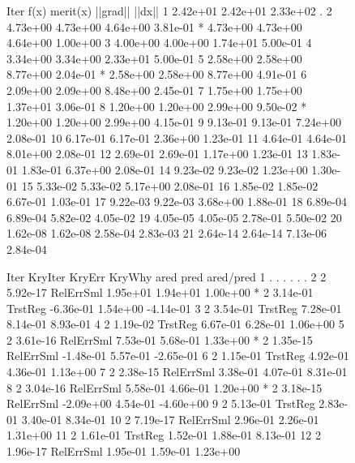 \begin{figure}
    \begin{lstPeopt}
Iter      f(x)      merit(x)  ||grad||  ||dx||    
1         2.42e+01  2.42e+01  2.33e+02  .         
2         4.73e+00  4.73e+00  4.64e+00  3.81e-01  
*         4.73e+00  4.73e+00  4.64e+00  1.00e+00  
3         4.00e+00  4.00e+00  1.74e+01  5.00e-01  
4         3.34e+00  3.34e+00  2.33e+01  5.00e-01  
5         2.58e+00  2.58e+00  8.77e+00  2.04e-01  
*         2.58e+00  2.58e+00  8.77e+00  4.91e-01  
6         2.09e+00  2.09e+00  8.48e+00  2.45e-01  
7         1.75e+00  1.75e+00  1.37e+01  3.06e-01  
8         1.20e+00  1.20e+00  2.99e+00  9.50e-02  
*         1.20e+00  1.20e+00  2.99e+00  4.15e-01  
9         9.13e-01  9.13e-01  7.24e+00  2.08e-01  
10        6.17e-01  6.17e-01  2.36e+00  1.23e-01  
11        4.64e-01  4.64e-01  8.01e+00  2.08e-01  
12        2.69e-01  2.69e-01  1.17e+00  1.23e-01  
13        1.83e-01  1.83e-01  6.37e+00  2.08e-01  
14        9.23e-02  9.23e-02  1.23e+00  1.30e-01  
15        5.33e-02  5.33e-02  5.17e+00  2.08e-01  
16        1.85e-02  1.85e-02  6.67e-01  1.03e-01  
17        9.22e-03  9.22e-03  3.68e+00  1.88e-01  
18        6.89e-04  6.89e-04  5.82e-02  4.05e-02  
19        4.05e-05  4.05e-05  2.78e-01  5.50e-02  
20        1.62e-08  1.62e-08  2.58e-04  2.83e-03  
21        2.64e-14  2.64e-14  7.13e-06  2.84e-04 
\end{lstPeopt}
    \begin{lstPeopt}
Iter      KryIter   KryErr    KryWhy    ared      pred      ared/pred 
1         .         .         .         .         .         .         
2         2         5.92e-17  RelErrSml 1.95e+01  1.94e+01  1.00e+00  
*         2         3.14e-01  TrstReg   -6.36e-01 1.54e+00  -4.14e-01 
3         2         3.54e-01  TrstReg   7.28e-01  8.14e-01  8.93e-01  
4         2         1.19e-02  TrstReg   6.67e-01  6.28e-01  1.06e+00  
5         2         3.61e-16  RelErrSml 7.53e-01  5.68e-01  1.33e+00  
*         2         1.35e-15  RelErrSml -1.48e-01 5.57e-01  -2.65e-01 
6         2         1.15e-01  TrstReg   4.92e-01  4.36e-01  1.13e+00  
7         2         2.38e-15  RelErrSml 3.38e-01  4.07e-01  8.31e-01  
8         2         3.04e-16  RelErrSml 5.58e-01  4.66e-01  1.20e+00  
*         2         3.18e-15  RelErrSml -2.09e+00 4.54e-01  -4.60e+00 
9         2         5.13e-01  TrstReg   2.83e-01  3.40e-01  8.34e-01  
10        2         7.19e-17  RelErrSml 2.96e-01  2.26e-01  1.31e+00  
11        2         1.61e-01  TrstReg   1.52e-01  1.88e-01  8.13e-01  
12        2         1.96e-17  RelErrSml 1.95e-01  1.59e-01  1.23e+00  

\end{lstPeopt}
\end{figure}
